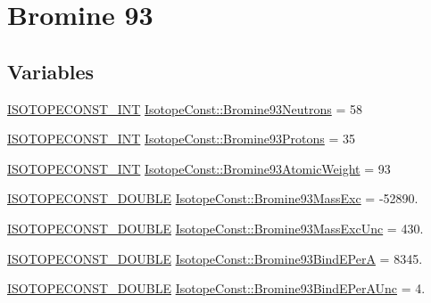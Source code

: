 \hypertarget{group___isotope_const-_bromine-_br93}{}\section{Bromine 93}
\label{group___isotope_const-_bromine-_br93}
\subsection*{Variables}
\begin{DoxyCompactItemize}
\item 
\mbox{\hyperlink{group___isotope_const-_macros_ga5f18360b3e99483a35c32d789e62621c}{I\+S\+O\+T\+O\+P\+E\+C\+O\+N\+S\+T\+\_\+\+I\+NT}} \mbox{\hyperlink{group___isotope_const-_bromine-_br93_gad734c00b8a8906a6b5ccbaeca9feb97b}{Isotope\+Const\+::\+Bromine93\+Neutrons}} = 58
\item 
\mbox{\hyperlink{group___isotope_const-_macros_ga5f18360b3e99483a35c32d789e62621c}{I\+S\+O\+T\+O\+P\+E\+C\+O\+N\+S\+T\+\_\+\+I\+NT}} \mbox{\hyperlink{group___isotope_const-_bromine-_br93_gad29f3cd5878cd05d5990668b8c8bad74}{Isotope\+Const\+::\+Bromine93\+Protons}} = 35
\item 
\mbox{\hyperlink{group___isotope_const-_macros_ga5f18360b3e99483a35c32d789e62621c}{I\+S\+O\+T\+O\+P\+E\+C\+O\+N\+S\+T\+\_\+\+I\+NT}} \mbox{\hyperlink{group___isotope_const-_bromine-_br93_ga634739e3308f34f30f576382512b4967}{Isotope\+Const\+::\+Bromine93\+Atomic\+Weight}} = 93
\item 
\mbox{\hyperlink{group___isotope_const-_macros_ga8f45a7272ce02c0b4c65c44636ed719a}{I\+S\+O\+T\+O\+P\+E\+C\+O\+N\+S\+T\+\_\+\+D\+O\+U\+B\+LE}} \mbox{\hyperlink{group___isotope_const-_bromine-_br93_ga4dd6e64ae68414182eb0e2f55da1c92d}{Isotope\+Const\+::\+Bromine93\+Mass\+Exc}} = -\/52890.
\item 
\mbox{\hyperlink{group___isotope_const-_macros_ga8f45a7272ce02c0b4c65c44636ed719a}{I\+S\+O\+T\+O\+P\+E\+C\+O\+N\+S\+T\+\_\+\+D\+O\+U\+B\+LE}} \mbox{\hyperlink{group___isotope_const-_bromine-_br93_ga9da4a587dd0c7e670cc1ae35d4faf3d7}{Isotope\+Const\+::\+Bromine93\+Mass\+Exc\+Unc}} = 430.
\item 
\mbox{\hyperlink{group___isotope_const-_macros_ga8f45a7272ce02c0b4c65c44636ed719a}{I\+S\+O\+T\+O\+P\+E\+C\+O\+N\+S\+T\+\_\+\+D\+O\+U\+B\+LE}} \mbox{\hyperlink{group___isotope_const-_bromine-_br93_ga24ce03d1d6b3f119e5cf1382a7a1feb9}{Isotope\+Const\+::\+Bromine93\+Bind\+E\+PerA}} = 8345.
\item 
\mbox{\hyperlink{group___isotope_const-_macros_ga8f45a7272ce02c0b4c65c44636ed719a}{I\+S\+O\+T\+O\+P\+E\+C\+O\+N\+S\+T\+\_\+\+D\+O\+U\+B\+LE}} \mbox{\hyperlink{group___isotope_const-_bromine-_br93_ga88bc6777864bfb164380a1ca11c6d7f3}{Isotope\+Const\+::\+Bromine93\+Bind\+E\+Per\+A\+Unc}} = 4.

\end{DoxyCompactItemize}
